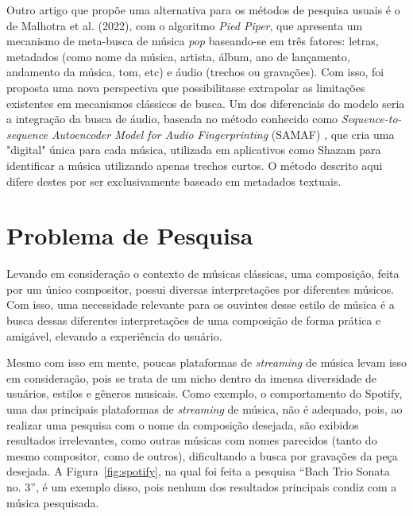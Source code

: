 \documentclass[12pt]{article}
\begin{document}
Outro artigo que propõe uma alternativa para os métodos de pesquisa
usuais é o de Malhotra et al. (2022), com o algoritmo \emph{Pied Piper},
que apresenta um mecanismo de meta-busca de música \emph{pop} baseando-se em
três fatores: letras, metadados (como nome da música, artista, álbum, ano de
lançamento, andamento da música, tom, etc) e áudio (trechos ou gravações).
Com isso, foi proposta uma nova perspectiva que possibilitasse extrapolar as
limitações existentes em mecanismos clássicos de busca. Um dos diferenciais do
modelo seria a integração da busca de áudio, baseada no método conhecido como
\emph{Sequence-to-sequence Autoencoder Model for Audio Fingerprinting} (SAMAF)
\cite{Ba+:20}, que cria uma "digital" única para cada música, utilizada
em aplicativos como Shazam para identificar a música utilizando apenas trechos
curtos.
O método descrito aqui difere destes por ser exclusivamente baseado em metadados
textuais.

\section{Problema de Pesquisa} \label{sec:problem}

Levando em consideração o contexto de músicas clássicas, uma composição, feita
por um único compositor, possui diversas interpretações por diferentes músicos.
Com isso, uma necessidade relevante para os ouvintes desse estilo de música é a
busca dessas diferentes interpretações de uma composição de forma prática e
amigável, elevando a experiência do usuário.

Mesmo com isso em mente, poucas plataformas de \emph{streaming} de música levam
isso em consideração, pois se trata de um nicho dentro da imensa diversidade de
usuários, estilos e gêneros musicais.
Como exemplo, o comportamento do Spotify, uma das principais plataformas de
\emph{streaming} de música, não é adequado, pois, ao realizar uma pesquisa com o
nome da composição desejada, são exibidos resultados irrelevantes, como outras
músicas com nomes parecidos (tanto do mesmo compositor, como de outros), 
dificultando a busca por gravações da peça desejada.
A Figura~\ref{fig:spotify}, na qual foi feita a pesquisa ``Bach Trio Sonata no. 3'',
é um exemplo disso, pois nenhum dos resultados principais condiz com a música
pesquisada.
\end{document}
